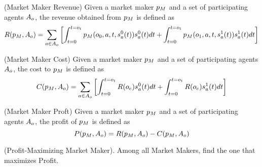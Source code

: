   \begin{definition} (Market Maker Revenue)
  \label{def:mmr}
   Given a market maker $p_M$ and a set of participating agents
   $A_o$, the revenue obtained from $p_M$ is defined as
     $$R(p_M, A_o) = 
      \sum_{a\in A_o} \left[
	\int_{t = 0}^{t = o_t} 
	  p_M(o_0,a,t, s^{0}_{a}(t))s^{0}_{a}(t)dt
	  + \int_{t = 0}^{t = o_t} 
	  p_M(o_1,a,t, s^{1}_{a}(t))s^{1}_{a}(t)dt\right]$$
  \end{definition}
  
    \begin{definition} (Market Maker Cost)
  \label{def:mmc}
   Given a market maker $p_M$ and a set of participating agents
   $A_o$, the cost to $p_M$ is defined as
     $$ C(p_M, A_o) =
     \sum_{a\in A_o} \left[
	\int_{t = 0}^{t = o_t} 
	R(o_e)s^{0}_{a}(t)dt
	+\int_{t = 0}^{t = o_t} 
	R(o_e)s^{1}_{a}(t)dt
	\right]$$
  \end{definition}

      \begin{definition} (Market Maker Proft)
  \label{def:mmf}
   Given a market maker $p_M$ and a set of participating agents
   $A_o$, the profit of $p_M$ is defined as
     $$ P(p_M, A_o) = R(p_M, A_o) 
     -C(p_M, A_o)$$
  \end{definition}
  
\begin{definition} (Profit-Maximizing Market Maker).
\label{def:pmmm}
Among all Market Makers, find the one that maximizes Profit.
\end{definition}


